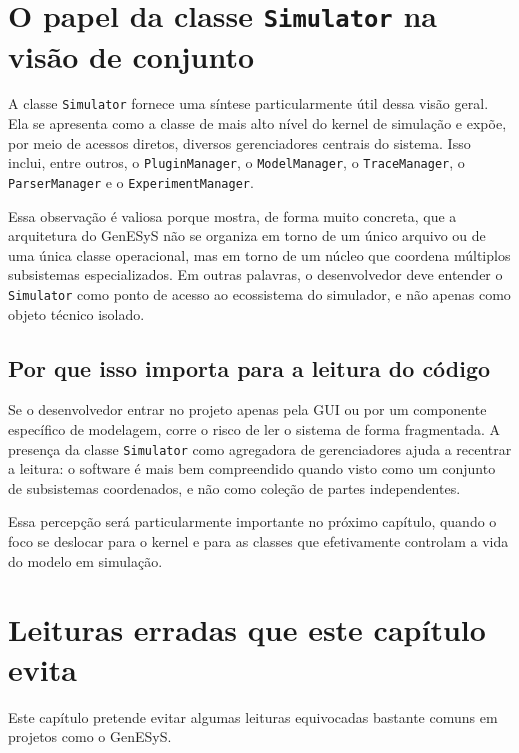 \section{O papel da classe \texttt{Simulator} na visão de conjunto}
\label{sec:cap6_papel_classe_simulator}

A classe \texttt{Simulator} fornece uma síntese particularmente útil dessa visão geral. Ela se apresenta como a classe de mais alto nível do kernel de simulação e expõe, por meio de acessos diretos, diversos gerenciadores centrais do sistema. Isso inclui, entre outros, o \texttt{PluginManager}, o \texttt{ModelManager}, o \texttt{TraceManager}, o \texttt{ParserManager} e o \texttt{ExperimentManager}.

Essa observação é valiosa porque mostra, de forma muito concreta, que a arquitetura do GenESyS não se organiza em torno de um único arquivo ou de uma única classe operacional, mas em torno de um núcleo que coordena múltiplos subsistemas especializados. Em outras palavras, o desenvolvedor deve entender o \texttt{Simulator} como ponto de acesso ao ecossistema do simulador, e não apenas como objeto técnico isolado.

\subsection{Por que isso importa para a leitura do código}
\label{subsec:cap6_por_que_importa_leitura_codigo}

Se o desenvolvedor entrar no projeto apenas pela GUI ou por um componente específico de modelagem, corre o risco de ler o sistema de forma fragmentada. A presença da classe \texttt{Simulator} como agregadora de gerenciadores ajuda a recentrar a leitura: o software é mais bem compreendido quando visto como um conjunto de subsistemas coordenados, e não como coleção de partes independentes.

Essa percepção será particularmente importante no próximo capítulo, quando o foco se deslocar para o kernel e para as classes que efetivamente controlam a vida do modelo em simulação.

\section{Leituras erradas que este capítulo evita}
\label{sec:cap6_leituras_erradas_evita}

Este capítulo pretende evitar algumas leituras equivocadas bastante comuns em projetos como o GenESyS.

